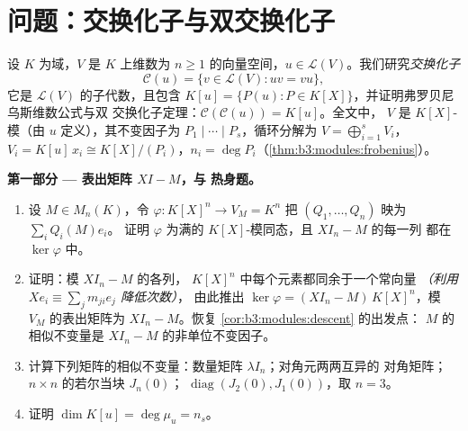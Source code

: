 \section{问题：交换化子与双交换化子}

\begin{problem}\label{pb:b3:modules:1}
设 $K$ 为域，$V$ 是 $K$ 上维数为 $n \geq
1$ 的向量空间，$u \in \mathcal L(V)$。我们研究\emph{交换化子}
\[
\mathcal C(u) = \{v \in \mathcal L(V) : uv = vu\},
\]
它是 $\mathcal L(V)$ 的子代数，且包含 $K[u] = \{P(u) : P \in
K[X]\}$，并证明弗罗贝尼乌斯维数公式与双
交换化子定理：$\mathcal C(\mathcal C(u)) = K[u]$。全文中，
$V$ 是 $K[X]$-模（由 $u$ 定义），其不变因子为
$P_1 \mid \cdots \mid P_s$，循环分解为 $V =
\bigoplus_{i=1}^s V_i$，$V_i = K[u]\,x_i \cong K[X]/(P_i)$，$n_i
= \deg P_i$（\cref{thm:b3:modules:frobenius}）。

\medskip
\noindent\textbf{第一部分 --- 表出矩阵 $XI - M$，与
热身题。}
\begin{enumerate}
  \item 设 $M \in M_n(K)$，令 $\varphi \colon K[X]^n \to V_M
        = K^n$ 把 $(Q_1, \dots, Q_n)$ 映为 $\sum_i Q_i(M)e_i$。
        证明 $\varphi$ 为满的
        $K[X]$-模同态，且 $XI_n - M$ 的每一列
        都在 $\ker\varphi$ 中。
  \item 证明：模 $XI_n - M$ 的各列，
        $K[X]^n$ 中每个元素都同余于一个常向量
        \emph{（利用 $Xe_i \equiv \sum_j m_{ji}e_j$ 降低次数）}，
        由此推出 $\ker\varphi = (XI_n - M)\,K[X]^n$，模
        $V_M$ 的表出矩阵为 $XI_n - M$。恢复
        \cref{cor:b3:modules:descent} 的出发点：
        $M$ 的相似不变量是
        $XI_n - M$ 的非单位不变因子。
  \item 计算下列矩阵的相似不变量：数量矩阵
        $\lambda I_n$；对角元两两互异的
        对角矩阵；$n \times n$ 的若尔当块 $J_n(0)$；
        $\operatorname{diag}(J_2(0), J_1(0))$，取 $n = 3$。
  \item 证明 $\dim K[u] = \deg \mu_u = n_s$。
\end{enumerate}


\end{problem}
